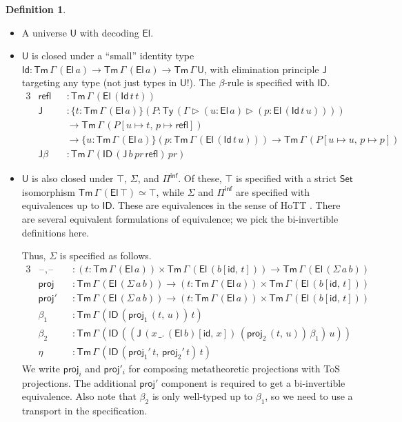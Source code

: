 \documentclass[12pt,a4paper,twoside,openany]{book}
\theoremstyle{remark}
\theoremstyle{definition}
\newtheorem{mydefinition}{Definition}
\theoremstyle{theorem}
\newcommand{\mi}[1]{\mathit{#1}}
\newcommand{\ms}[1]{\mathsf{#1}}
\newcommand{\J}{\ms{J}}
\newcommand{\refl}{\mathsf{refl}}
\newcommand{\id}{\mathsf{id}}
\newcommand{\Tm}{\mathsf{Tm}}
\newcommand{\Ty}{\mathsf{Ty}}
\newcommand{\U}{\mathsf{U}}
\newcommand{\El}{\mathsf{El}}
\newcommand{\Id}{\mathsf{Id}}
\newcommand{\ID}{\mathsf{ID}}
\newcommand{\proj}{\mathsf{proj}}
\newcommand{\blank}{\mathord{\hspace{1pt}\text{--}\hspace{1pt}}}
\newcommand{\Set}{\mathsf{Set}}
\newcommand{\ext}{\triangleright}
\newcommand{\Piinf}{\Pi^{\mathsf{inf}}}
\begin{document}
\begin{mydefinition}
\begin{itemize}
\item A universe $\U$ with decoding $\El$.
\item
  $\U$ is closed under a ``small'' identity type $\Id : \Tm\,\Gamma\,(\El\,a)
  \to \Tm\,\Gamma\,(\El\,a) \to \Tm\,\Gamma\,\U$, with elimination principle
  $\J$ targeting any type (not just types in $\U$!). The $\beta$-rule is
  specified with $\ID$.
  \begin{alignat*}{3}
  & \refl &&: \Tm\,\Gamma\,(\El\,(\Id\,t\,t))\\
  & \J &&: \{t : \Tm\,\Gamma\,(\El\,a)\}
         (P : \Ty\,(\Gamma\ext(u : \El\,a)\ext(p : \El\,(\Id\,t\,u))))\\
  & &&\to \Tm\,\Gamma\,(P[u \mapsto t,\,p \mapsto \refl])\\
  & &&\to \{u : \Tm\,\Gamma\,(\El\,a)\}
       (p : \Tm\,\Gamma\,(\El\,(\Id\,t\,u)))
  \to \Tm\,\Gamma\,(P[u \mapsto u,\,p \mapsto p])\\
  &\J\beta &&: \Tm\,\Gamma\,(\ID\,(\J\,b\,\mi{pr}\,\refl)\,\mi{pr})
  \end{alignat*}
\item
  $\U$ is also closed under $\top$, $\Sigma$, and $\Piinf$. Of these, $\top$ is
  specified with a strict $\Set$ isomorphism $\Tm\,\Gamma\,(\El\,\top) \simeq \top$,
  while $\Sigma$ and $\Piinf$ are specified with equivalences up to $\ID$. These
  are equivalences in the sense of HoTT \cite[Chapter~4]{hottbook}. There are
  several equivalent formulations of equivalence; we pick the bi-invertible
  definitions here.

  Thus, $\Sigma$ is specified as follows.
  \begin{alignat*}{3}
   &\ms{\blank\!,\!\blank} &&:
      (t : \Tm\,\Gamma\,(\El\,a)) \times \Tm\,\Gamma\,(\El\,(b[\id,\,t]))
    \to \Tm\,\Gamma\,(\El\,(\Sigma\,a\,b))\\
   &\ms{proj}         &&: \Tm\,\Gamma\,(\El\,(\Sigma\,a\,b))
    \to (t : \Tm\,\Gamma\,(\El\,a)) \times \Tm\,\Gamma\,(\El\,(b[\id,\,t]))\\
   &\ms{proj'}        &&: \Tm\,\Gamma\,(\El\,(\Sigma\,a\,b))
     \to (t : \Tm\,\Gamma\,(\El\,a)) \times \Tm\,\Gamma\,(\El\,(b[\id,\,t]))\\
   &\beta_1 &&: \Tm\,\Gamma\,(\ID\,(\proj_1\,(t,\,u))\,t)\\
   &\beta_2 &&: \Tm\,\Gamma\,(\ID\,((\J\,(x\,\_.\,(\El\,b)[\id,\,x])\,(\proj_2\,(t,\,u))\,\beta_1)\,u))\\
   &\eta    &&: \Tm\,\Gamma\,(\ID\,(\proj_1'\,t,\,\proj_2'\,t)\,t)
  \end{alignat*}
  We write $\proj_i$ and $\proj'_i$ for composing metatheoretic projections with
  ToS projections. The additional $\proj'$ component is required to get a
  bi-invertible equivalence. Also note that $\beta_2$ is only well-typed up to
  $\beta_1$, so we need to use a transport in the specification.


\end{itemize}
\end{mydefinition}
\end{document}
